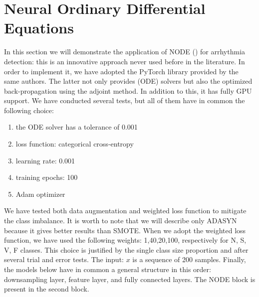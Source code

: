\documentclass[LaM,binding=0.6cm]{sapthesis}
\begin{document}
\section{Neural Ordinary Differential Equations}
\label{sec:nodesection}
In this section we will demonstrate the application of NODE (\cite{DBLP:journals/corr/abs-1806-07366}) for arrhythmia detection: this is an innovative approach never used before in the literature. In order to implement it, we have adopted the PyTorch library provided by the same authors. The latter not only provides (ODE) solvers but also the optimized back-propagation using the adjoint method. In addition to this, it has fully GPU support. We have conducted several tests, but all of them have in common the following choice:
\begin{enumerate}
\item the ODE solver has a tolerance of 0.001
\item loss function: categorical cross-entropy
\item learning rate: 0.001
\item training epochs: 100
\item Adam optimizer 
\end{enumerate}
We have tested both data augmentation and weighted loss function to mitigate the class imbalance. It is worth to note that we will describe only ADASYN because it gives better results than SMOTE. When we adopt the weighted loss function, we have used the following weights: 1,40,20,100, respectively for N, S, V, F classes. This choice is justified by the single class size proportion and after several trial and error tests. The input: $x$ is a sequence of 200 samples. Finally, the models below have in common a general structure in this order: downsampling layer, feature layer, and fully connected layers. The NODE block is present in the second block.
\end{document}
